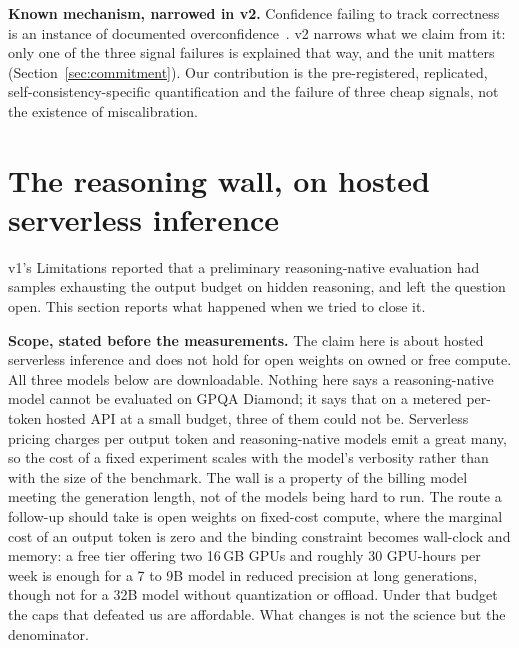 \documentclass{article}
\begin{document}
\textbf{Known mechanism, narrowed in v2.} Confidence failing to track
correctness is an instance of documented
overconfidence~\citep{guo2017calibration, kadavath2022language}. v2 narrows
what we claim from it: only one of the three signal failures is explained that
way, and the unit matters (Section~\ref{sec:commitment}). Our contribution is
the pre-registered, replicated, self-consistency-specific quantification and
the failure of three cheap signals, not the existence of miscalibration.

\section{The reasoning wall, on hosted serverless inference}
\label{sec:wall}

v1's Limitations reported that a preliminary reasoning-native evaluation had
samples exhausting the output budget on hidden reasoning, and left the question
open. This section reports what happened when we tried to close it.

\textbf{Scope, stated before the measurements.} The claim here is about hosted
serverless inference and does not hold for open weights on owned or free
compute. All three models below are downloadable. Nothing here says a
reasoning-native model cannot be evaluated on GPQA Diamond; it says that on a
metered per-token hosted API at a small budget, three of them could not be.
Serverless pricing charges per output token and reasoning-native models emit a
great many, so the cost of a fixed experiment scales with the model's verbosity
rather than with the size of the benchmark. The wall is a property of the
billing model meeting the generation length, not of the models being hard to
run. The route a follow-up should take is open weights on fixed-cost compute,
where the marginal cost of an output token is zero and the binding constraint
becomes wall-clock and memory: a free tier offering two 16\,GB GPUs and roughly
30 GPU-hours per week is enough for a 7 to 9B model in reduced precision at
long generations, though not for a 32B model without quantization or offload.
Under that budget the caps that defeated us are affordable. What changes is not
the science but the denominator.
\end{document}
